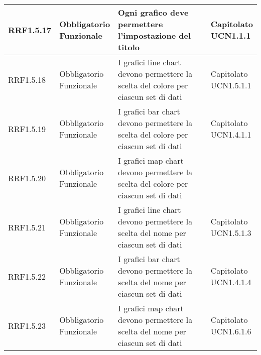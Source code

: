 \begin{longtabu}[c]{|X[0.7,l]|X[l]|X[2.5,l]|X[l]|}
                RRF1.5.17 & 
                \parbox[t]{4cm}{ Obbligatorio \\ Funzionale} & Ogni grafico deve permettere l'impostazione del titolo & \parbox[t]{4cm}{Capitolato \\ UCN1.1.1 }  \\ 
                \hline
                
                RRF1.5.18 & 
                \parbox[t]{4cm}{ Obbligatorio \\ Funzionale} & I grafici line chart devono permettere la scelta del colore per ciascun set di dati & \parbox[t]{4cm}{Capitolato \\ UCN1.5.1.1 }  \\ 
                \hline
                
                RRF1.5.19 & 
                \parbox[t]{4cm}{ Obbligatorio \\ Funzionale} & I grafici bar chart devono permettere la scelta del colore per ciascun set di dati & \parbox[t]{4cm}{Capitolato \\ UCN1.4.1.1 }  \\ 
                \hline
                
                RRF1.5.20 & 
                \parbox[t]{4cm}{ Obbligatorio \\ Funzionale} & I grafici map chart devono permettere la scelta del colore per ciascun set di dati & \parbox[t]{4cm}{}  \\ 
                \hline
                
                RRF1.5.21 & 
                \parbox[t]{4cm}{ Obbligatorio \\ Funzionale} & I grafici line chart devono permettere la scelta del nome per ciascun set di dati & \parbox[t]{4cm}{Capitolato \\ UCN1.5.1.3 }  \\ 
                \hline
                
                RRF1.5.22 & 
                \parbox[t]{4cm}{ Obbligatorio \\ Funzionale} & I grafici bar chart devono permettere la scelta del nome per ciascun set di dati & \parbox[t]{4cm}{Capitolato \\ UCN1.4.1.4 }  \\ 
                \hline
                
                RRF1.5.23 & 
                \parbox[t]{4cm}{ Obbligatorio \\ Funzionale} & I grafici map chart devono permettere la scelta del nome per ciascun set di dati & \parbox[t]{4cm}{Capitolato \\ UCN1.6.1.6 }  \\ 
                \hline
                

\end{longtabu}
